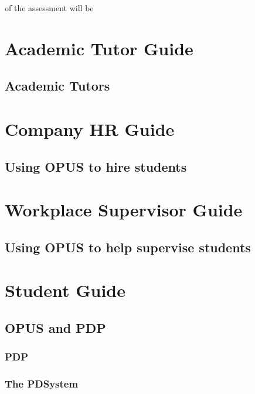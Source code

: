 \documentclass[12 pt]{book}
\begin{document}
 of the assessment will be




%
%
%

\part{Academic Tutor Guide}

\chapter{Academic Tutors}

\part{Company HR Guide}

\chapter{Using OPUS to hire students}



\part{Workplace Supervisor Guide}

\chapter{Using OPUS to help supervise students}



\part{Student Guide}

%
%
%

\chapter{OPUS and PDP}

\section{PDP}

\section{The PDSystem}
\end{document}

